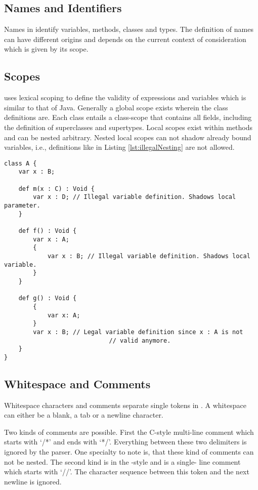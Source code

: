 \subsection{Names and Identifiers}
Names in \ooplss identify variables, methods, classes and types. The
definition of names can have different origins and depends on the current
context of consideration which is given by its scope.

\subsection{Scopes}
\ooplss uses lexical scoping to define the validity of expressions and
variables which is similar to that of Java. Generally a global
scope exists wherein the class definitions are. Each class entails a class-scope
that contains all fields, including the definition of superclasses and
supertypes. Local scopes exist within methods and can be nested arbitrary.
Nested local scopes can not shadow already bound variables, i.e., definitions
like in Listing \ref{lst:illegalNesting} are not allowed.

\begin{lstlisting}[float=ht,language=ooplss,caption=Variable definition in local scope,label=lst:illegalNesting]
class A {
	var x : B;

	def m(x : C) : Void {
		var x : D; // Illegal variable definition. Shadows local parameter.
	}

	def f() : Void {
		var x : A;
		{
			var x : B; // Illegal variable definition. Shadows local variable.
		}
	}

	def g() : Void {
		{
			var x: A;
		}
		var x : B; // Legal variable definition since x : A is not
							 // valid anymore.
	}
}
\end{lstlisting}
\subsection{Whitespace and Comments}
Whitespace characters and comments separate single tokens in \ooplss. A
whitespace can either be a blank, a tab or a newline character.

Two kinds of comments are possible. First the C-style multi-line comment which
starts with `/*' and ends with `*/'. Everything between these two delimiters
is ignored by the parser. One specialty to note is, that these kind of comments
can not be nested.
The second kind is in the \cpp-style and is a single- line comment which starts
with `//'. The character sequence between this token and the next newline
is ignored.


